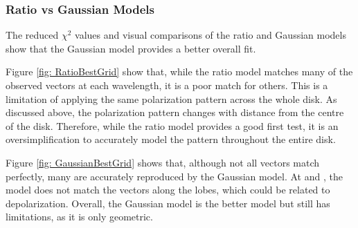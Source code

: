\subsubsection{Ratio vs Gaussian Models}

The reduced $\chi^2$ values and visual comparisons of the ratio and Gaussian models show that the Gaussian model provides a better overall fit. 


Figure \ref{fig: RatioBestGrid} show that, while the ratio model matches many of the observed vectors at each wavelength, it is a poor match for others. This is a limitation of applying the same polarization pattern across the whole disk. As discussed above, the polarization pattern changes with distance from the centre of the disk. Therefore, while the ratio model provides a good first test, it is an oversimplification to accurately model the pattern throughout the entire disk. 


Figure \ref{fig: GaussianBestGrid} shows that, although not all vectors match perfectly, many are accurately reproduced by the Gaussian model. At \bsix and \bsevenNS, the model does not match the vectors along the lobes, which could be related to depolarization.  Overall, the Gaussian model is the better model but still has limitations, as it is only geometric. 